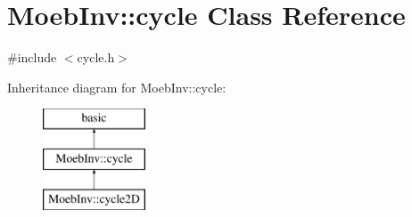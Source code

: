 \hypertarget{class_moeb_inv_1_1cycle}{}\section{Moeb\+Inv\+:\+:cycle Class Reference}
\label{class_moeb_inv_1_1cycle}


{\ttfamily \#include $<$cycle.\+h$>$}

Inheritance diagram for Moeb\+Inv\+:\+:cycle\+:\begin{figure}[H]
\begin{center}
\leavevmode
\includegraphics[height=3.000000cm]{class_moeb_inv_1_1cycle}
\end{center}
\end{figure}
